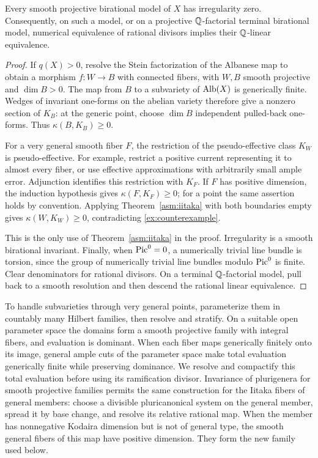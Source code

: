 \begin{lemma}\label{ex:irregularity}
Every smooth projective birational model of \(X\) has irregularity zero.
Consequently, on such a model, or on a projective \(\mathbb{Q}\)-factorial
terminal birational model, numerical equivalence of rational divisors
implies their \(\mathbb{Q}\)-linear equivalence.
\end{lemma}
\begin{proof}
If \(q(X)>0\), resolve the Stein factorization of the Albanese map to
obtain a morphism \(f:W\to B\) with connected fibers, with \(W,B\)
smooth projective and \(\dim B>0\). The map from \(B\) to a subvariety
of \(\operatorname{Alb}(X)\) is generically finite. Wedges of invariant one-forms
on the abelian variety therefore give a nonzero section of \(K_B\):
at the generic point, choose \(\dim B\) independent pulled-back
one-forms. Thus \(\kappa(B,K_B)\geq0\).

For a very general smooth fiber \(F\), the restriction of the
pseudo-effective class \(K_W\) is pseudo-effective. For example, restrict
a positive current representing it to almost every fiber, or use
effective approximations with arbitrarily small ample error.
Adjunction identifies this restriction with \(K_F\). If \(F\) has
positive dimension, the induction hypothesis gives
\(\kappa(F,K_F)\geq0\); for a point the same assertion holds by
convention. Applying Theorem~\ref{asm:iitaka} with both boundaries
empty gives \(\kappa(W,K_W)\geq0\), contradicting
\eqref{ex:counterexample}.

This is the only use of Theorem~\ref{asm:iitaka} in the proof.
Irregularity is a smooth birational invariant. Finally, when
\(\operatorname{Pic}^0=0\), a numerically trivial line bundle is torsion, since the
group of numerically trivial line bundles modulo \(\operatorname{Pic}^0\) is
finite. Clear denominators for rational divisors. On a terminal
\(\mathbb{Q}\)-factorial model, pull back to a smooth resolution and then
descend the rational linear equivalence.
\end{proof}

To handle subvarieties through very general points, parameterize
them in countably many Hilbert families, then resolve and stratify.
On a suitable open parameter space the domains form a smooth
projective family with integral fibers, and evaluation is dominant.
When each fiber maps generically finitely onto its image, general
ample cuts of the parameter space make total evaluation generically
finite while preserving dominance. We resolve and compactify this
total evaluation before using its ramification divisor.
Invariance of plurigenera for smooth projective families
\cite[Theorem~1]{Paun2007} permits the same construction for the
Iitaka fibers of general members: choose a divisible pluricanonical
system on the general member, spread it by base change, and resolve
its relative rational map. When the member has nonnegative Kodaira
dimension but is not of general type, the smooth general fibers
of this map have positive dimension. They form the new family
used below.


